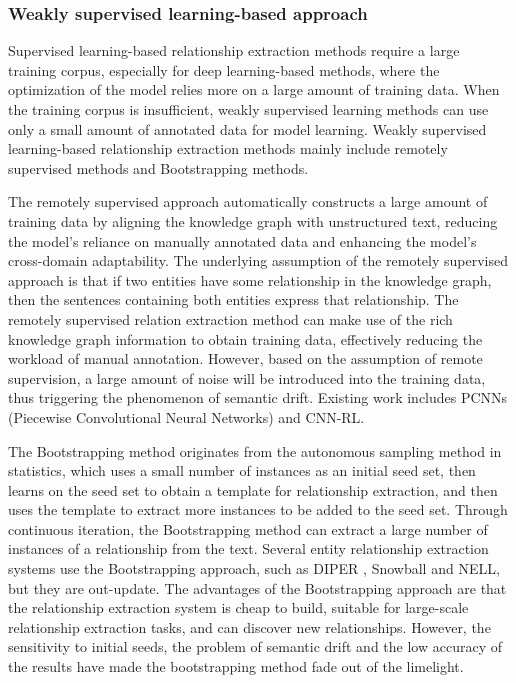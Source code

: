 \documentclass[%
 aip,
 jmp,%
 amsmath,amssymb,
 reprint,%
]{revtex4-2}
\begin{document}
\subsubsection{Weakly supervised learning-based approach}
Supervised learning-based relationship extraction methods require a large training corpus, 
especially for deep learning-based methods, where the optimization of the model relies more on a 
large amount of training data. When the training corpus is insufficient, weakly supervised learning methods 
can use only a small amount of annotated data for model learning. Weakly supervised learning-based relationship 
extraction methods mainly include remotely supervised methods and Bootstrapping methods.

The remotely supervised approach automatically constructs a large amount of training data by 
aligning the knowledge graph with unstructured text, reducing the model's reliance on manually 
annotated data and enhancing the model's cross-domain adaptability. The underlying assumption 
of the remotely supervised approach is that if two entities have some relationship in the knowledge graph, 
then the sentences containing both entities express that relationship. The remotely supervised relation 
extraction method can make use of the rich knowledge graph information to obtain training data, 
effectively reducing the workload of manual annotation. However, based on the assumption of 
remote supervision, a large amount of noise will be introduced into the training data, 
thus triggering the phenomenon of semantic drift. Existing work includes PCNNs (Piecewise Convolutional Neural Networks) \cite{ji2008mixed} and
CNN-RL\cite{wen2020new}.

The Bootstrapping method originates from the autonomous sampling method in statistics, 
which uses a small number of instances as an initial seed set, then learns on the seed set 
to obtain a template for relationship extraction, and then uses the template to extract more instances 
to be added to the seed set. Through continuous iteration, the Bootstrapping method can extract 
a large number of instances of a relationship from the text. Several entity relationship extraction 
systems use the Bootstrapping approach, such as DIPER \cite{gallet2015diuretic}, Snowball \cite{agichtein2000snowball} and NELL, but they are out-update. 
The advantages of the Bootstrapping approach are that the relationship extraction system is cheap to build, 
suitable for large-scale relationship extraction tasks, and can discover new relationships. 
However, the sensitivity to initial seeds, the problem of semantic drift and the low accuracy of the 
results have made the bootstrapping method fade out of the limelight.
\end{document}
